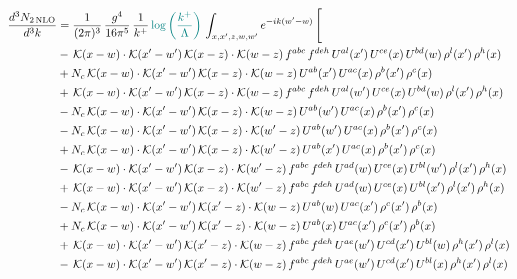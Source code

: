 \documentclass[9pt]{article}
\numberwithin{equation}{section}
\begin{document}
\begin{align}
\frac{d^{3}N_{2\,\mathrm{NLO}}}{d^{3}k} & = \frac{1}{(2\pi)^{3}}\,\frac{g^{4}}{16\pi^{5}}\,\frac{1}{k^{+}}\,{\color{teal}\log{\left(\frac{k^{+}}{\Lambda}\right)}}\,\int_{x,x',z,w,w'}e^{-ik(w'-w)}\,\Bigg[\notag\\ & -\,\mathcal{K}(x-w)\cdot\mathcal{K}(x'-w')\,\mathcal{K}(x-z)\cdot\mathcal{K}(w-z)\,f^{abc}\,f^{deh}\,U^{al}(x')\,U^{ce}(x)\,U^{bd}(w)\,\rho^{l}(x')\,\rho^{h}(x)\notag\\
& +N_{c}\,\mathcal{K}(x-w)\cdot\mathcal{K}(x'-w')\,\mathcal{K}(x-z)\cdot\mathcal{K}(w-z)\,U^{ab}(x')\,U^{ac}(x)\,\rho^{b}(x')\,\rho^{c}(x)\notag\\
& +\,\mathcal{K}(x-w)\cdot\mathcal{K}(x'-w')\,\mathcal{K}(x-z)\cdot\mathcal{K}(w-z)\,f^{abc}\,f^{deh}\,U^{al}(w')\,U^{ce}(x)\,U^{bd}(w)\,\rho^{l}(x')\,\rho^{h}(x)\notag\\
& -N_{c}\,\mathcal{K}(x-w)\cdot\mathcal{K}(x'-w')\,\mathcal{K}(x-z)\cdot\mathcal{K}(w-z)\,U^{ab}(w')\,U^{ac}(x)\,\rho^{b}(x')\,\rho^{c}(x)\notag\\
& -N_{c}\,\mathcal{K}(x-w)\cdot\mathcal{K}(x'-w')\,\mathcal{K}(x-z)\cdot\mathcal{K}(w'-z)\,U^{ab}(w')\,U^{ac}(x)\,\rho^{b}(x')\,\rho^{c}(x)\notag\\
& +N_{c}\,\mathcal{K}(x-w)\cdot\mathcal{K}(x'-w')\,\mathcal{K}(x-z)\cdot\mathcal{K}(w'-z)\,U^{ab}(x')\,U^{ac}(x)\,\rho^{b}(x')\,\rho^{c}(x)\notag\\
& -\,\mathcal{K}(x-w)\cdot\mathcal{K}(x'-w')\,\mathcal{K}(x-z)\cdot\mathcal{K}(w'-z)\,f^{abc}\,f^{deh}\,U^{ad}(w)\,U^{ce}(x)\,U^{bl}(w')\,\rho^{l}(x')\,\rho^{h}(x)\notag\\
& +\,\mathcal{K}(x-w)\cdot\mathcal{K}(x'-w')\,\mathcal{K}(x-z)\cdot\mathcal{K}(w'-z)\,f^{abc}\,f^{deh}\,U^{ad}(w)\,U^{ce}(x)\,U^{bl}(x')\,\rho^{l}(x')\,\rho^{h}(x)\notag\\
& -N_{c}\,\mathcal{K}(x-w)\cdot\mathcal{K}(x'-w')\,\mathcal{K}(x'-z)\cdot\mathcal{K}(w-z)\,U^{ab}(w)\,U^{ac}(x')\,\rho^{c}(x')\,\rho^{b}(x)\notag\\
& +N_{c}\,\mathcal{K}(x-w)\cdot\mathcal{K}(x'-w')\,\mathcal{K}(x'-z)\cdot\mathcal{K}(w-z)\,U^{ab}(x)\,U^{ac}(x')\,\rho^{c}(x')\,\rho^{b}(x)\notag\\
& +\,\mathcal{K}(x-w)\cdot\mathcal{K}(x'-w')\,\mathcal{K}(x'-z)\cdot\mathcal{K}(w-z)\,f^{abc}\,f^{deh}\,U^{ae}(w')\,U^{cd}(x')\,U^{bl}(w)\,\rho^{h}(x')\,\rho^{l}(x)\notag\\
& -\,\mathcal{K}(x-w)\cdot\mathcal{K}(x'-w')\,\mathcal{K}(x'-z)\cdot\mathcal{K}(w-z)\,f^{abc}\,f^{deh}\,U^{ae}(w')\,U^{cd}(x')\,U^{bl}(x)\,\rho^{h}(x')\,\rho^{l}(x)\notag\\

\end{align}
\end{document}
